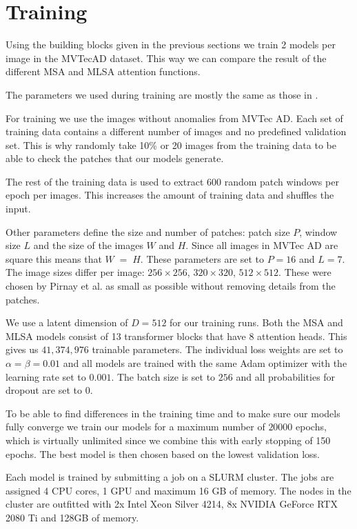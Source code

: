 \section{Training}

Using the building blocks given in the previous sections we train 2 models per image in the MVTecAD dataset. This way we can compare the result of the different MSA and MLSA attention functions.

The parameters we used during training are mostly the same as those in \cite{pirnay_inpainting_2021}.

For training we use the images without anomalies from MVTec AD. Each set of training data contains a different number of images and no predefined validation set. This is why randomly take 10\% or 20 images from the training data to be able to check the patches that our models generate.

The rest of the training data is used to extract 600 random patch windows per epoch per images. This increases the amount of training data and shuffles the input.

Other parameters define the size and number of patches: patch size $P$, window size $L$ and the size of the images $W$ and $H$. Since all images in MVTec AD are square this means that $W \;=\; H$. These parameters are set to $P = 16$ and $L = 7$. The image sizes differ per image: $256 \times 256$, $320 \times 320$, $512 \times 512$. These were chosen by Pirnay et al. as small as possible without removing details from the patches.

We use a latent dimension of $D = 512$ for our training runs. Both the MSA and MLSA models consist of 13 transformer blocks that have 8 attention heads. This gives us $41,374,976$ trainable parameters. The individual loss weights are set to $\alpha = \beta = 0.01$ and all models are trained with the same Adam optimizer with the learning rate set to $0.001$. The batch size is set to $256$ and all probabilities for dropout are set to $0$.

To be able to find differences in the training time and to make sure our models fully converge we train our models for a maximum number of $20000$ epochs, which is virtually unlimited since we combine this with early stopping of 150 epochs. The best model is then chosen based on the lowest validation loss.

Each model is trained by submitting a job on a SLURM cluster. The jobs are assigned 4 CPU cores, 1 GPU and maximum 16 GB of memory. The nodes in the cluster are outfitted with 2x Intel Xeon Silver 4214, 8x NVIDIA GeForce RTX 2080 Ti and 128GB of memory.

